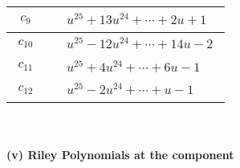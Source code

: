 \documentclass[1p]{elsarticle_modified}
\theoremstyle{definition}
\begin{document}
\begin{tabular}{m{50pt}|m{274pt}}
\hline $$\begin{aligned}c_{9}\end{aligned}$$&$\begin{aligned}
&u^{25}+13 u^{24}+\cdots+2 u+1
\end{aligned}$\\
\hline $$\begin{aligned}c_{10}\end{aligned}$$&$\begin{aligned}
&u^{25}-12 u^{24}+\cdots+14 u-2
\end{aligned}$\\
\hline $$\begin{aligned}c_{11}\end{aligned}$$&$\begin{aligned}
&u^{25}+4 u^{24}+\cdots+6 u-1
\end{aligned}$\\
\hline $$\begin{aligned}c_{12}\end{aligned}$$&$\begin{aligned}
&u^{25}-2 u^{24}+\cdots+u-1
\end{aligned}$\\
\hline
\end{tabular}\\~\\
\newpage\renewcommand{\arraystretch}{1}
\flushleft \textbf{(v) Riley Polynomials at the component}\newline \\
\end{document}
